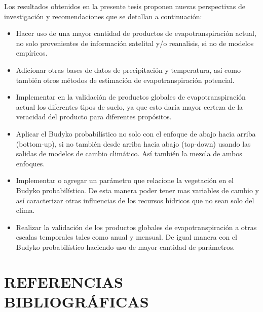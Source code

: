 \documentclass[12pt]{article}
\begin{document}
Los resultados obtenidos en la presente tesis proponen nuevas perspectivas de investigación y recomendaciones que se detallan a continuación:

\begin{itemize}
    \item Hacer uso de una mayor cantidad de productos de evapotranspiración actual, no solo provenientes de información satelital y/o reanalisis, si no de modelos empíricos.
    
    \item Adicionar otras bases de datos de precipitación y temperatura, así como también otros métodos de estimación de evapotranspiración potencial.
    
    \item Implementar en la validación de productos globales de evapotranspiración actual los diferentes tipos de suelo, ya que esto daría mayor certeza de la veracidad del producto para diferentes propósitos.
    
    \item Aplicar el Budyko probabilístico no solo con el enfoque de abajo hacia arriba (bottom-up), si no también desde arriba hacia abajo (top-down) usando las salidas de modelos de cambio climático. Así también la mezcla de ambos enfoques.

    \item Implementar o agregar un parámetro que relacione la vegetación en el Budyko probabilístico. De esta manera poder tener mas variables de cambio y así caracterizar otras influencias de los recursos hídricos que no sean solo del clima.
    
    \item Realizar la validación de los productos globales de evapotranspiración a otras escalas temporales tales como anual y mensual. De igual manera con el Budyko probabilístico haciendo uso de mayor cantidad de parámetros.
    
    
\end{itemize}


\clearpage
\vspace*{0.5mm}
\section{REFERENCIAS BIBLIOGRÁFICAS}




\clearpage
\vspace*{0.5mm}
\end{document}
